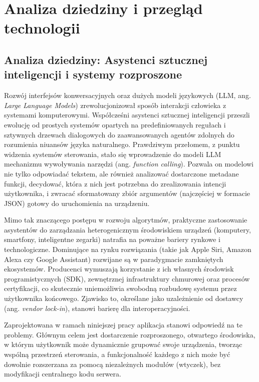 \chapter{Analiza dziedziny i przegląd technologii}
\label{cha:analiza_dziedziny}

\section{Analiza dziedziny: Asystenci sztucznej inteligencji i systemy rozproszone}
\label{sec:analiza_asystentow_iot}
Rozwój interfejsów konwersacyjnych oraz dużych modeli językowych (LLM, ang. \textit{Large Language Models}) zrewolucjonizował sposób interakcji człowieka z systemami komputerowymi. Współcześni asystenci sztucznej inteligencji przeszli ewolucję od prostych systemów opartych na predefiniowanych regułach i sztywnych drzewach dialogowych do zaawansowanych agentów zdolnych do rozumienia niuansów języka naturalnego. Prawdziwym przełomem, z punktu widzenia systemów sterowania, stało się wprowadzenie do modeli LLM mechanizmu wywoływania narzędzi (ang. \textit{function calling}). Pozwala on modelowi nie tylko odpowiadać tekstem, ale również analizować dostarczone metadane funkcji, decydować, która z nich jest potrzebna do zrealizowania intencji użytkownika, i zwracać sformatowany zbiór argumentów (najczęściej w formacie JSON) gotowy do uruchomienia na urządzeniu.

Mimo tak znaczącego postępu w rozwoju algorytmów, praktyczne zastosowanie asystentów do zarządzania heterogenicznym środowiskiem urządzeń (komputery, smartfony, inteligentne zegarki) natrafia na poważne bariery rynkowe i technologiczne. Dominujące na rynku rozwiązania (takie jak Apple Siri, Amazon Alexa czy Google Assistant) rozwijane są w paradygmacie zamkniętych ekosystemów. Producenci wymuszają korzystanie z ich własnych środowisk programistycznych (SDK), zewnętrznej infrastruktury chmurowej oraz procesów certyfikacji, co skutecznie uniemożliwia swobodną rozbudowę systemu przez użytkownika końcowego. Zjawisko to, określane jako uzależnienie od dostawcy (ang. \textit{vendor lock-in}), stanowi barierę dla interoperacyjności.

Zaprojektowana w ramach niniejszej pracy aplikacja stanowi odpowiedź na te problemy. Głównym celem jest dostarczenie rozproszonego, otwartego środowiska, w którym użytkownik może dynamicznie grupować swoje urządzenia, tworząc wspólną przestrzeń sterowania, a funkcjonalność każdego z nich może być dowolnie rozszerzana za pomocą niezależnych modułów (wtyczek), bez modyfikacji centralnego kodu serwera.


